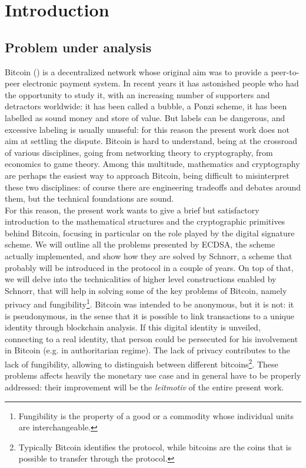 \chapter{Introduction}
\label{chpr:intro}
\section{Problem under analysis}
Bitcoin (\cite{BTC}) is a decentralized network whose original aim was to provide a peer-to-peer electronic payment system. In recent years it has astonished people who had the opportunity to study it, with an increasing number of supporters and detractors worldwide: it has been called a bubble, a Ponzi scheme, it has been labelled as sound money and store of value. But labels can be dangerous, and excessive labeling is usually unuseful: for this reason the present work does not aim at settling the dispute. Bitcoin is hard to understand, being at the crossroad of various disciplines, going from networking theory to cryptography, from economics to game theory. Among this multitude, mathematics and cryptography are perhaps the easiest way to approach Bitcoin, being difficult to misinterpret these two disciplines: of course there are engineering tradeoffs and debates around them, but the technical foundations are sound.
\\
For this reason, the present work wants to give a brief but satisfactory introduction to the mathematical structures and the cryptographic primitives behind Bitcoin, focusing in particular on the role played by the digital signature scheme. We will outline all the problems presented by ECDSA, the scheme actually implemented, and show how they are solved by Schnorr, a scheme that probably will be introduced in the protocol in a couple of years. On top of that, we will delve into the technicalities of higher level constructions enabled by Schnorr, that will help in solving some of the key problems of Bitcoin, namely privacy and fungibility\footnote{Fungibility is the property of a good or a commodity whose individual units are interchangeable.}. Bitcoin was intended to be anonymous, but it is not: it is pseudonymous, in the sense that it is possible to link transactions to a unique identity through blockchain analysis. If this digital identity is unveiled, connecting to a real identity, that person could be persecuted for his involvement in Bitcoin (e.g. in authoritarian regime). The lack of privacy contributes to the lack of fungibility, allowing to distinguish between different bitcoins\footnote{Typically Bitcoin identifies the protocol, while bitcoins are the coins that is possible to transfer through the protocol.}. These problems affects heavily the monetary use case and in general have to be properly addressed: their improvement will be the \textit{leitmotiv} of the entire present work.

